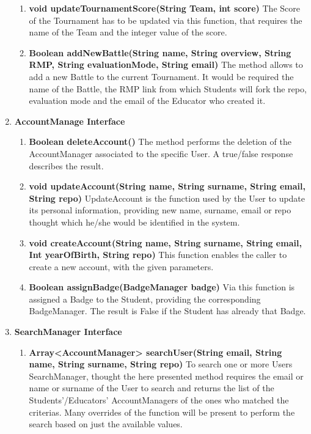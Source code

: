 \begin{enumerate}
\begin{enumerate}[label=$\bullet$]
        \item \textbf{void updateTournamentScore(String Team, int score)} The Score of the Tournament has to be updated via this function, that requires the name of the Team and the integer value of the score.
        \item \textbf{Boolean addNewBattle(String name, String overview, String RMP, String evaluationMode, String email)} The method allows to add a new Battle to the current Tournament. It would be required the name of the Battle, the RMP link from which Students will fork the repo, evaluation mode and the email of the Educator who created it.
        \end{enumerate}
    \item \textbf{AccountManage Interface} 
        \begin{enumerate}[label=$\bullet$]
            \item \textbf{Boolean deleteAccount()} The method performs the deletion of the AccountManager associated to the specific User. A true/false response describes the result.
            \item \textbf{void updateAccount(String name, String surname, String email, String repo)} UpdateAccount is the function used by the User to update its personal information, providing new name, surname, email or repo thought which he/she would be identified in the system.
            \item \textbf{void createAccount(String name, String surname, String email, Int yearOfBirth, String repo)} This function enables the caller to create a new account, with the given parameters.
            \item \textbf{Boolean assignBadge(BadgeManager badge)} Via this function is assigned a Badge to the Student, providing the corresponding BadgeManager. The result is False if the Student has already that Badge.
        \end{enumerate}
    \item \textbf{SearchManager Interface} 
        \begin{enumerate}[label=$\bullet$]
            \item \textbf{Array<AccountManager> searchUser(String email, String name, String surname, String repo)} To search one or more Users SearchManager, thought the here presented method requires the email or name or surname of the User to search and returns the list of the Students'/Educators' AccountManagers of the ones who matched the criterias. Many overrides of the function will be present to perform the search based on just the available values.

\end{enumerate}
\end{enumerate}

